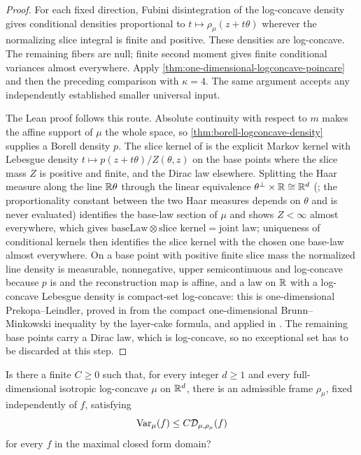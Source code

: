 \begin{proof}
  \leanok
  For each fixed direction, Fubini disintegration of the log-concave density gives conditional
  densities proportional to $t\mapsto\rho_\mu(z+t\theta)$ wherever the normalizing slice
  integral is finite and positive. These densities are log-concave. The remaining fibers are
  null; finite second moment gives finite conditional variances almost everywhere. Apply
  \cref{thm:one-dimensional-logconcave-poincare} and then the preceding comparison with
  $\kappa=4$. The same argument accepts any independently established smaller universal input.

  The Lean proof follows this route.  Absolute continuity with respect to $m$ makes the affine
  support of $\mu$ the whole space, so \cref{thm:borell-logconcave-density} supplies a Borell
  density $p$.  The slice kernel of  is the explicit
  Markov kernel with Lebesgue density $t\mapsto p(z+t\theta)/Z(\theta,z)$ on the base points
  where the slice mass $Z$ is positive and finite, and the Dirac law elsewhere.  Splitting the
  Haar measure along the line $\mathbb{R}\theta$ through the linear equivalence
  $\theta^{\perp}\times\mathbb{R}\cong\mathbb{R}^d$ (; the proportionality
  constant between the two Haar measures depends on $\theta$ and is never evaluated) identifies
  the base-law section of $\mu$ and shows $Z<\infty$ almost everywhere, which gives
  $\mathrm{baseLaw}\otimes\text{slice kernel}=\text{joint law}$; uniqueness of conditional
  kernels then identifies the slice kernel with the chosen one base-law almost everywhere.  On a
  base point with positive finite slice mass the normalized line density is measurable,
  nonnegative, upper semicontinuous and log-concave because $p$ is and the reconstruction map is
  affine, and a law on $\mathbb{R}$ with a log-concave Lebesgue density is compact-set log-concave: this
  is one-dimensional Prekopa--Leindler, proved in 
  from the compact one-dimensional Brunn--Minkowski inequality by the layer-cake formula, and
  applied in .  The remaining base points carry a Dirac
  law, which is log-concave, so no exceptional set has to be discarded at this step.
\end{proof}

\begin{question}
  \label{q:conditional-fiber-frame}
  Is there a finite $C\ge0$ such that, for every integer $d\ge1$ and every full-dimensional
  isotropic log-concave $\mu$ on $\mathbb{R}^d$, there is an admissible frame $\rho_\mu$, fixed
  independently of $f$, satisfying
  \[
    \operatorname{Var}_\mu(f)\le C\mathcal D_{\mu,\rho_\mu}(f)
  \]
  for every $f$ in the maximal closed form domain?
\end{question}

